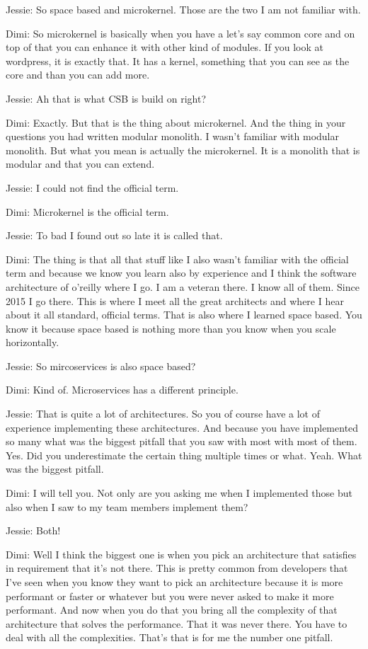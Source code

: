Jessie: So space based and microkernel. Those are the two I am not familiar with.

Dimi: So microkernel is basically when you have a let's say common core and on top of that you can enhance it with other kind of modules. If you look at wordpress, it is exactly that. It has a kernel, something that you can see as the core and than you can add more.

Jessie: Ah that is what CSB is build on right?

Dimi: Exactly. But that is the thing about microkernel. And the thing in your questions you had written modular monolith. I wasn't familiar with modular monolith. But what you mean is actually the microkernel. It is a monolith that is modular and that you can extend.

Jessie: I could not find the official term.

Dimi: Microkernel is the official term.

Jessie: To bad I found out so late it is called that.

Dimi: The thing is that all that stuff like I also wasn't familiar with the official term and because we know you learn also by experience and I think the software architecture of o'reilly where I go. I am a veteran there. I know all of them. Since 2015 I go there. This is where I meet all the great architects and where I hear about it all standard, official terms. That is also where I learned space based. You know it because space based is nothing more than you know when you scale horizontally.

Jessie: So mircoservices is also space based?

Dimi: Kind of. Microservices has a different principle.

Jessie: That is quite a lot of architectures. So you of course have a lot of experience implementing these architectures. And because you have implemented so many what was the biggest pitfall that you saw with most with most of them. Yes. Did you underestimate the certain thing multiple times or what. Yeah. What was the biggest pitfall.

Dimi: I will tell you. Not only are you asking me when I implemented those but also when I saw to my team members implement them?

Jessie: Both!

Dimi: Well I think the biggest one is when you pick an architecture that satisfies in requirement that it's not there. This is pretty common from developers that I've seen when you know they want to pick an architecture because it is more performant or faster or whatever but you were never asked to make it more performant. And now when you do that you bring all the complexity of that architecture that solves the performance. That it was never there. You have to deal with all the complexities. That's that is for me the number one pitfall.


